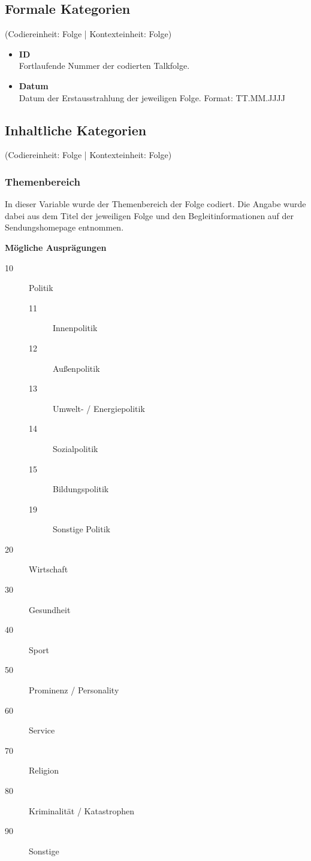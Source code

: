 {\subsection{Formale Kategorien}

(Codiereinheit: Folge | Kontexteinheit: Folge)

\begin{itemize}
	\item \textbf{ID} \\
	Fortlaufende Nummer der codierten Talkfolge.
	\item \textbf{Datum} \\
	Datum der Erstausstrahlung der jeweiligen Folge. Format: TT.MM.JJJJ
\end{itemize}

\subsection{Inhaltliche Kategorien}

(Codiereinheit: Folge | Kontexteinheit: Folge)

\subsubsection{Themenbereich}

In dieser Variable wurde der Themenbereich der Folge codiert. Die Angabe wurde dabei aus dem Titel der jeweiligen Folge und den Begleitinformationen auf der Sendungshomepage entnommen.
	
\begin{list}{}{}
	\item \textbf{Mögliche Ausprägungen}
	\begin{description}
		\item[10] Politik
		\begin{description}
			\item[11] Innenpolitik
			\item[12] Außenpolitik
			\item[13] Umwelt- / Energiepolitik
			\item[14] Sozialpolitik
			\item[15] Bildungspolitik
			\item[19] Sonstige Politik
		\end{description}
		\item[20] Wirtschaft
		\item[30] Gesundheit
		\item[40] Sport
		\item[50] Prominenz / Personality
		\item[60] Service
		\item[70] Religion
		\item[80] Kriminalität / Katastrophen
		\item[90] Sonstige
	\end{description}
\end{list}

}
